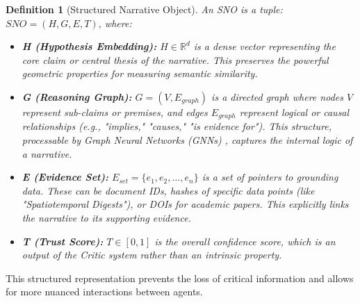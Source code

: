 \documentclass[12pt, a4paper]{article}
\newtheorem{definition}{Definition}[section]
\begin{document}
\begin{definition}[Structured Narrative Object]
An SNO is a tuple: $SNO = (H, G, E, T)$, where:
\begin{itemize}
    \item \textbf{H (Hypothesis Embedding):} $H \in \mathbb{R}^d$ is a dense vector representing the core claim or central thesis of the narrative. This preserves the powerful geometric properties for measuring semantic similarity.
    \item \textbf{G (Reasoning Graph):} $G = (V, E_{graph})$ is a directed graph where nodes $V$ represent sub-claims or premises, and edges $E_{graph}$ represent logical or causal relationships (e.g., "implies," "causes," "is evidence for"). This structure, processable by Graph Neural Networks (GNNs) \cite{Kipf2017GCN}, captures the internal logic of a narrative.
    \item \textbf{E (Evidence Set):} $E_{set} = \{e_1, e_2, \dots, e_n\}$ is a set of pointers to grounding data. These can be document IDs, hashes of specific data points (like "Spatiotemporal Digests"), or DOIs for academic papers. This explicitly links the narrative to its supporting evidence.
    \item \textbf{T (Trust Score):} $T \in [0, 1]$ is the overall confidence score, which is an \textit{output} of the Critic system rather than an intrinsic property.
\end{itemize}
\end{definition}

This structured representation prevents the loss of critical information and allows for more nuanced interactions between agents.
\end{document}
